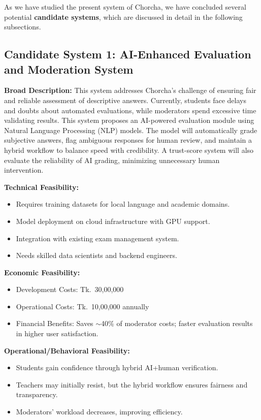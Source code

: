 \documentclass[12pt,a4paper,oneside]{book}
\begin{document}
As we have studied the present system of Chorcha, we have concluded several potential \textbf{candidate systems}, which are discussed in detail in the following subsections.

\subsection{Candidate System 1: AI-Enhanced Evaluation and Moderation System}

\textbf{Broad Description:}
This system addresses Chorcha’s challenge of ensuring fair and reliable assessment of descriptive answers. Currently, students face delays and doubts about automated evaluations, while moderators spend excessive time validating results. This system proposes an AI-powered evaluation module using Natural Language Processing (NLP) models. The model will automatically grade subjective answers, flag ambiguous responses for human review, and maintain a hybrid workflow to balance speed with credibility. A trust-score system will also evaluate the reliability of AI grading, minimizing unnecessary human intervention.

\textbf{Technical Feasibility:}
\begin{itemize}
    \item Requires training datasets for local language and academic domains.
    \item Model deployment on cloud infrastructure with GPU support.
    \item Integration with existing exam management system.
    \item Needs skilled data scientists and backend engineers.
\end{itemize}

\textbf{Economic Feasibility:}
\begin{itemize}
    \item Development Costs: Tk.~30,00,000
    \item Operational Costs: Tk.~10,00,000 annually
    \item Financial Benefits: Saves $\sim$40\% of moderator costs; faster evaluation results in higher user satisfaction.
\end{itemize}

\textbf{Operational/Behavioral Feasibility:}
\begin{itemize}
    \item Students gain confidence through hybrid AI+human verification.
    \item Teachers may initially resist, but the hybrid workflow ensures fairness and transparency.
    \item Moderators’ workload decreases, improving efficiency.
\end{itemize}
\end{document}
